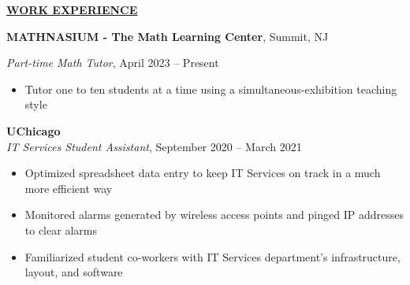 \documentclass[
]{article}
\providecommand{\tightlist}{%
  \setlength{\itemsep}{0pt}\setlength{\parskip}{0pt}}
\begin{document}


\textbf{\underline{WORK EXPERIENCE}}




\textbf{MATHNASIUM - The Math Learning Center}, Summit, NJ

\emph{Part-time Math Tutor}, April 2023 -- Present

\begin{itemize}
\tightlist
\item
    Tutor one to ten students at a time using a simultaneous-exhibition teaching style
\end{itemize}

\textbf{UChicago}\\
\emph{IT Services Student Assistant}, September %
2020 -- March %
2021

\begin{itemize}
\tightlist
\item
  Optimized spreadsheet data entry to keep IT Services on track in a
  much more efficient way
\end{itemize}

\begin{itemize}
\item
  Monitored alarms generated by wireless access points and pinged IP
  addresses to clear alarms
\item
  Familiarized student co-workers with IT Services department's
  infrastructure, layout, and software
\end{itemize}
\end{document}
